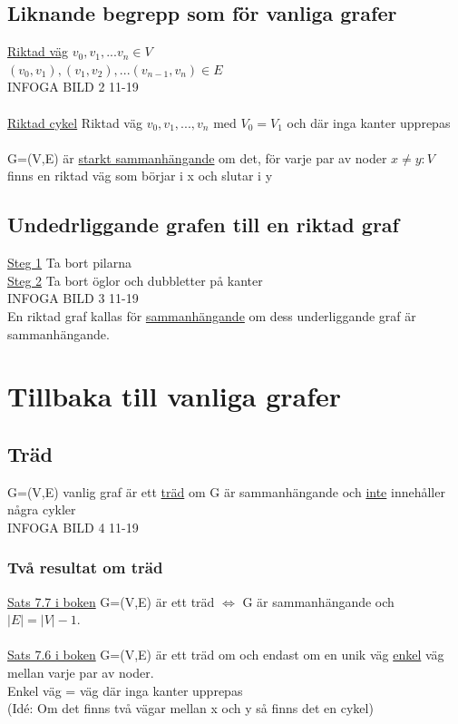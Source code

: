 \documentclass{article}
\begin{document}
    \subsection{Liknande begrepp som för vanliga grafer}
    \underline{Riktad väg} $v_{0}, v_{1}, ... v_{n}\in V$\\
    \indent $(v_{0}, v_{1}), (v_{1}, v_{2}), ... (v_{n-1}, v_{n})\in E$\\
    INFOGA BILD 2 11-19\\\\
    \underline{Riktad cykel} Riktad väg $v_{0}, v_{1}, ..., v_{n}$ med $V_{0}=V_{1}$ och där inga kanter upprepas\\\\
    G=(V,E) är \underline{starkt sammanhängande} om det, för varje par av noder $x\neq y : V$ finns en riktad väg som börjar i x och slutar i y
    \subsection{Undedrliggande grafen till en riktad graf}
    \underline{Steg 1} Ta bort pilarna\\
    \underline{Steg 2} Ta bort öglor och dubbletter på kanter\\
    INFOGA BILD 3 11-19\\
    En riktad graf kallas för \underline{sammanhängande} om dess underliggande graf är sammanhängande.
    \section{Tillbaka till vanliga grafer}
    \subsection{Träd}
    G=(V,E) vanlig graf är ett \underline{träd} om G är sammanhängande och \underline{inte} innehåller några cykler\\
    INFOGA BILD 4 11-19
    \subsubsection{Två resultat om träd}
        \underline{Sats 7.7 i boken} G=(V,E) är ett träd $\Leftrightarrow$ G är sammanhängande och $|E|=|V|-1$.\\\\
        \underline{Sats 7.6 i boken} G=(V,E) är ett träd om och endast om en unik väg \underline{enkel} väg mellan varje par av noder.\\
        Enkel väg = väg där inga kanter upprepas\\
        (Idé: Om det finns två vägar mellan x och y så finns det en cykel)\\
\end{document}
